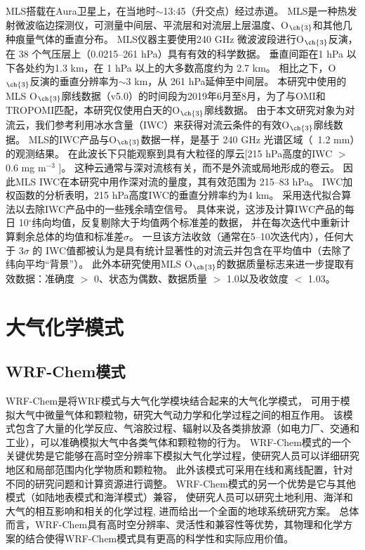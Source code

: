 MLS搭载在Aura卫星上，在当地时$\sim$13:45（升交点）经过赤道。
MLS是一种热发射微波临边探测仪，可测量中间层、平流层和对流层上层温度、O$_{\ch{3}}$和其他几种痕量气体的垂直分布。
MLS仪器主要使用240 GHz 微波波段进行O$_{\ch{3}}$反演，在 38 个气压层上（0.0215--261 hPa）具有有效的科学数据。
垂直间距在1 hPa 以下各处约为1.3 km，在 1 hPa 以上的大多数高度约为 2.7 km。
相比之下，O$_{\ch{3}}$反演的垂直分辨率为$\sim$3 km，从 261 hPa延伸至中间层。
本研究中使用的MLS O$_{\ch{3}}$廓线数据（v5.0）的时间段为2019年6月至8月，为了与OMI和TROPOMI匹配，本研究仅使用白天的O$_{\ch{3}}$廓线数据。
由于本文研究对象为对流云，我们参考\citet{Livesey.2013}利用冰水含量（IWC）来获得对流云条件的有效O$_{\ch{3}}$廓线数据。
MLS的IWC产品与O$_{\ch{3}}$数据一样，是基于 240 GHz 光谱区域（~1.2 mm）的观测结果。
在此波长下只能观察到具有大粒径的厚云[215 hPa高度的IWC $>$ 0.6 mg m$^{-3}$ \citep{Wu.2008}]。 这种云通常与深对流核有关，而不是外流或局地形成的卷云。
因此MLS IWC在本研究中用作深对流的量度，其有效范围为 215--83 hPa。
IWC加权函数的分析表明，215 hPa高度IWC的垂直分辨率约为4 km\citep{Wu.2008}。
\citet{Livesey.2013}采用迭代拟合算法以去除IWC产品中的一些残余晴空信号。
具体来说，这涉及计算IWC产品的每日 10$^{\circ}$纬向均值，反复剔除大于均值两个标准差的数据，
并在每次迭代中重新计算剩余总体的均值和标准差$\sigma$。
一旦该方法收敛（通常在5--10次迭代内），任何大于 3$\sigma$ 的 IWC值都被认为是具有统计显著性的对流云并包含在平均值中（去除了纬向平均“背景”）。
此外本研究使用MLS O$_{\ch{3}}$的数据质量标志来进一步提取有效数据：准确度 $>$ 0、状态为偶数、数据质量 $>$ 1.0以及收敛度 $<$ 1.03。


\section{大气化学模式}

\subsection{WRF-Chem模式}

WRF-Chem是将WRF模式与大气化学模块结合起来的大气化学模式，
可用于模拟大气中微量气体和颗粒物，研究大气动力学和化学过程之间的相互作用。
该模式包含了大量的化学反应、气溶胶过程、辐射以及各类排放源（如电力厂、交通和工业），可以准确模拟大气中各类气体和颗粒物的行为。
WRF-Chem模式的一个关键优势是它能够在高时空分辨率下模拟大气化学过程，使研究人员可以详细研究地区和局部范围内化学物质和颗粒物。
此外该模式可采用在线和离线配置，针对不同的研究问题和计算资源进行调整。
WRF-Chem模式的另一个优势是它与其他模式（如陆地表模式和海洋模式）兼容，
使研究人员可以研究土地利用、海洋和大气的相互影响和相关的化学过程,
进而给出一个全面的地球系统研究方案。
总体而言，WRF-Chem具有高时空分辨率、灵活性和兼容性等优势，其物理和化学方案的结合使得WRF-Chem模式具有更高的科学性和实际应用价值。


